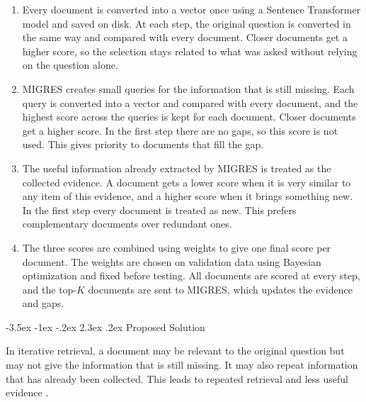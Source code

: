 \documentclass[12pt,a4paper]{report}
\makeatletter
\renewcommand\section{\@startsection{section}{1}{\z@}%
    {-3.5ex \@plus -1ex \@minus -.2ex}%
    {2.3ex \@plus.2ex}%
    {\normalfont\fontsize{16}{19}\selectfont\bfseries}}
\makeatother
\begin{document}
\justifying
\begin{enumerate}[leftmargin=0.30in,itemsep=0.14in,parsep=0pt]

\item
Every document is converted into a vector once using a Sentence Transformer model \cite{reimers2019sentence} and saved on disk. At each step, the original question is converted in the same way and compared with every document. Closer documents get a higher score, so the selection stays related to what was asked without relying on the question alone.

\item
MIGRES \cite{wang2025migres} creates small queries for the information that is still missing. Each query is converted into a vector and compared with every document, and the highest score across the queries is kept for each document. Closer documents get a higher score. In the first step there are no gaps, so this score is not used. This gives priority to documents that fill the gap.

\item
The useful information already extracted by MIGRES is treated as the collected evidence. A document gets a lower score when it is very similar to any item of this evidence, and a higher score when it brings something new. In the first step every document is treated as new. This prefers complementary documents over redundant ones.

\item
The three scores are combined using weights to give one final score per document. The weights are chosen on validation data using Bayesian optimization \cite{snoek2012practical} and fixed before testing. All documents are scored at every step, and the top-$K$ documents are sent to MIGRES, which updates the evidence and gaps.

\end{enumerate}

\section{Proposed Solution}

\justifying

In iterative retrieval, a document may be relevant to the original question but may not give the information that is still missing. It may also repeat information that has already been collected. This leads to repeated retrieval and less useful evidence \cite{yadav2020iterative,pickett2024better,wang2025migres}.
\end{document}
